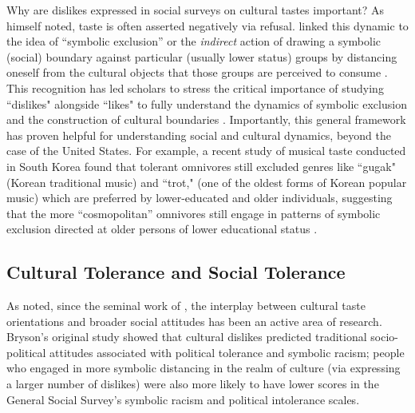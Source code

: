 \documentclass[12pt]{article}
\begin{document}
Why are dislikes expressed in social surveys on cultural tastes important? As \citet[56]{bourdieu1984distinction-835} himself noted, taste is often asserted negatively via refusal. \citet{bryson1996anything-311} linked this dynamic to the idea of ``symbolic exclusion'' or the \textit{indirect} action of drawing a symbolic (social) boundary against particular (usually lower status) groups by distancing oneself from the cultural objects that those groups are perceived to consume \citep{lizardo2016cultural-aaa}. This recognition has led scholars to stress the critical importance of studying ``dislikes" alongside ``likes" to fully understand the dynamics of symbolic exclusion and the construction of cultural boundaries \citep{lizardo2015musical-8c6, lindblom2022growing-ded, oncini2023cultural-323}. Importantly, this general framework has proven helpful for understanding social and cultural dynamics, beyond the case of the United States. For example, a recent study of musical taste conducted in South Korea found that tolerant omnivores still excluded genres like ``gugak" (Korean traditional music) and ``trot," (one of the oldest forms of Korean popular music) which are preferred by lower-educated and older individuals, suggesting that the more ``cosmopolitan'' omnivores still engage in patterns of symbolic exclusion directed at older persons of lower educational status \citep[321]{kim2020anything-71b}. 

\subsection*{Cultural Tolerance and Social Tolerance}

As noted, since the seminal work of \citet{bryson1996anything-311}, the interplay between cultural taste orientations and broader social attitudes has been an active area of research. Bryson's original study showed that cultural dislikes predicted traditional socio-political attitudes associated with political tolerance and symbolic racism; people who engaged in more symbolic distancing in the realm of culture (via expressing a larger number of dislikes) were also more likely to have lower scores in the General Social Survey's symbolic racism and political intolerance scales. 
\end{document}
